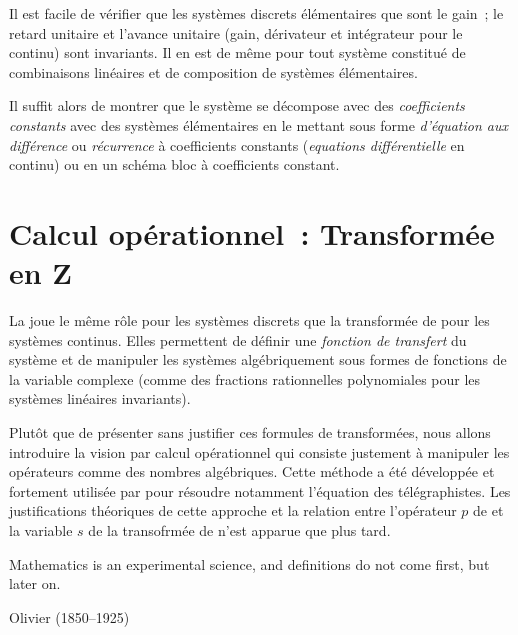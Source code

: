\begin{remarque}
  Il est facile de vérifier que les systèmes discrets élémentaires que
  sont le gain~; le retard unitaire et l'avance unitaire (gain,
  dérivateur et intégrateur pour le continu) sont invariants.  Il en
  est de même pour tout système constitué de combinaisons linéaires
  et de composition de systèmes élémentaires.
  
  Il suffit alors de montrer que le système se décompose avec des
  \emph{coefficients constants} avec des systèmes élémentaires en le
  mettant sous forme \emph{d'équation aux différence} ou
  \emph{récurrence} à coefficients constants (\emph{equations
    différentielle} en continu) ou en un schéma bloc à coefficients
  constant.
\end{remarque}

\section{Calcul opérationnel~: Transformée en Z}

La \teZ{} joue le même rôle pour les systèmes discrets que la
transformée de \Laplace{} pour les systèmes continus. Elles permettent
de définir une \emph{fonction de transfert} du système et de manipuler
les systèmes algébriquement sous formes de fonctions de la variable
complexe (comme des fractions rationnelles polynomiales pour les
systèmes linéaires invariants).

Plutôt que de présenter sans justifier ces formules de transformées,
nous allons introduire la vision par calcul opérationnel qui consiste
justement à manipuler les opérateurs comme des nombres
algébriques. Cette méthode a été développée et fortement utilisée par
\Heaviside{} pour résoudre notamment l'équation des
télégraphistes. Les justifications théoriques de cette approche et la
relation entre l'opérateur $p$ de \Heaviside{} et la variable $s$ de
la transofrmée de \Laplace{} n'est apparue que plus tard.

\begin{citations} Mathematics is an experimental science, and definitions do not come
  first, but later on.

  \hfill Olivier \Heaviside{} (1850--1925)
\end{citations}

